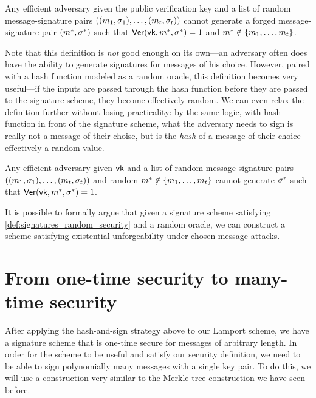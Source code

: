 \begin{definition}
Any efficient adversary given the public verification key and a list of random message-signature pairs $((m_1, \sigma_1), \ldots, (m_t, \sigma_t))$ cannot generate a forged
message-signature pair $(m^*, \sigma^*)$ 
such that $\mathsf{Ver}(\mathsf{vk}, m^*, \sigma^*) = 1$ and $m^* \notin \left\{ m_1, \ldots, m_t \right\}$.
\iffalse
For all efficient adversaries $\calA$:
  \[\Pr\left[ \Ver(\vk, m^*, \sig^*) = 1 \colon 
\begin{aligned}
  (\sk, \vk) &\gets \Gen()\\
  m_i &\getsr \calM \text{, for $i \in \{1, \dots, t\}$}\\
  \sig_i &\gets \Sign(\sk, m_i) \text{, for $i \in \{1, \dots, t\}$}\\
  (m^*, \sigma^*) &\gets \calA\big((m_1, \sig_1), \dots, (m_t, \sig_t) \big)
\end{aligned} \right] \]
\fi
\end{definition}

Note that this definition is \emph{not} good enough on its own---an adversary often does have the ability to generate signatures for messages of his choice. However, paired with a hash function modeled as a random oracle, this definition becomes very useful---if the inputs are passed through the hash function before they are passed to the signature scheme, they become effectively random. We can even relax the definition further without losing practicality: by the same logic, with hash function in front of the signature scheme, what the adversary needs to sign is really not a message of their choise, but is the \emph{hash} of a message of their choice---effectively a random value.

\begin{definition} \label{def:signatures_random_security}
	Any efficient adversary given $\mathsf{vk}$ and a list of random message-signature pairs $((m_1, \sigma_1), \ldots, (m_t, \sigma_t))$ and random $m^* \notin \left\{ m_1, \ldots, m_t \right\}$ cannot generate $\sigma^*$ such that $\mathsf{Ver}(\mathsf{vk}, m^*, \sigma^*) = 1$.
\end{definition}

It is possible to formally argue that given a signature scheme satisfying \cref{def:signatures_random_security} and a random oracle, we can construct a scheme satisfying existential unforgeability under chosen message attacks.

\section{From one-time security to many-time security}
\label{sec:sig:manytime}
After applying the hash-and-sign strategy above to our Lamport scheme, we
have a signature scheme that is one-time secure for messages of arbitrary
length. In order for the scheme to be useful and satisfy our security
definition, we need to be able to sign polynomially many messages with
a single key pair. To do this, we will use a construction very similar
to the Merkle tree construction we have seen before.

